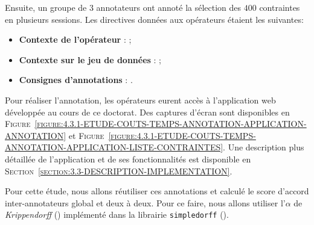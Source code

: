 			Ensuite, un groupe de $3$ annotateurs ont annoté la sélection des $400$ contraintes en plusieurs sessions.
			Les directives données aux opérateurs étaient les suivantes:
			\begin{itemize}
				\item \textbf{Contexte de l'opérateur} :
				 ;
				\item \textbf{Contexte sur le jeu de données} :
				 ;
				\item \textbf{Consignes d'annotations} :
				.
			\end{itemize}
			Pour réaliser l'annotation, les opérateurs eurent accès à l'application web développée au cours de ce doctorat.
			Des captures d'écran sont disponibles en \textsc{Figure~\ref{figure:4.3.1-ETUDE-COUTS-TEMPS-ANNOTATION-APPLICATION-ANNOTATION}} et \textsc{Figure~\ref{figure:4.3.1-ETUDE-COUTS-TEMPS-ANNOTATION-APPLICATION-LISTE-CONTRAINTES}}.
			Une description plus détaillée de l'application et de ses fonctionnalités est disponible en \textsc{Section~\ref{section:3.3-DESCRIPTION-IMPLEMENTATION}}.
			
			Pour cette étude, nous allons réutiliser ces annotations et calculé le score d'accord inter-annotateurs global et deux à deux.
			Pour ce faire, nous allons utiliser l'$\alpha$ de \textit{Krippendorff} (\cite{krippendorff:2004:content-analysis-introduction}) implémenté dans la librairie \texttt{simpledorff} (\cite{perry:2021:lighttag-text-annotation}).
			
